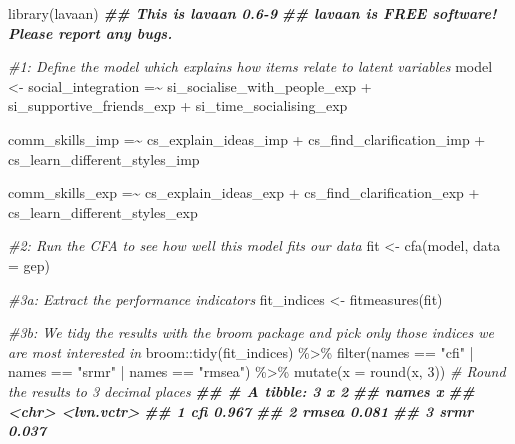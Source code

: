 \documentclass[
]{book}
\newenvironment{Shaded}{\begin{snugshade}}{\end{snugshade}}
\newcommand{\AttributeTok}[1]{\textcolor[rgb]{0.77,0.63,0.00}{#1}}
\newcommand{\CommentTok}[1]{\textcolor[rgb]{0.56,0.35,0.01}{\textit{#1}}}
\newcommand{\DecValTok}[1]{\textcolor[rgb]{0.00,0.00,0.81}{#1}}
\newcommand{\DocumentationTok}[1]{\textcolor[rgb]{0.56,0.35,0.01}{\textbf{\textit{#1}}}}
\newcommand{\FunctionTok}[1]{\textcolor[rgb]{0.00,0.00,0.00}{#1}}
\newcommand{\NormalTok}[1]{#1}
\newcommand{\OtherTok}[1]{\textcolor[rgb]{0.56,0.35,0.01}{#1}}
\newcommand{\SpecialCharTok}[1]{\textcolor[rgb]{0.00,0.00,0.00}{#1}}
\newcommand{\StringTok}[1]{\textcolor[rgb]{0.31,0.60,0.02}{#1}}
\begin{document}
\begin{Shaded}
\begin{Highlighting}[]
\FunctionTok{library}\NormalTok{(lavaan)}
\DocumentationTok{\#\# This is lavaan 0.6{-}9}
\DocumentationTok{\#\# lavaan is FREE software! Please report any bugs.}

\CommentTok{\#1: Define the model which explains how items relate to latent variables}
\NormalTok{model }\OtherTok{\textless{}{-}} \StringTok{\textquotesingle{}}
\StringTok{social\_integration =\textasciitilde{}}
\StringTok{si\_socialise\_with\_people\_exp +}
\StringTok{si\_supportive\_friends\_exp +}
\StringTok{si\_time\_socialising\_exp}

\StringTok{comm\_skills\_imp =\textasciitilde{}}
\StringTok{cs\_explain\_ideas\_imp +}
\StringTok{cs\_find\_clarification\_imp +}
\StringTok{cs\_learn\_different\_styles\_imp}

\StringTok{comm\_skills\_exp =\textasciitilde{}}
\StringTok{cs\_explain\_ideas\_exp +}
\StringTok{cs\_find\_clarification\_exp +}
\StringTok{cs\_learn\_different\_styles\_exp}
\StringTok{\textquotesingle{}}

\CommentTok{\#2: Run the CFA to see how well this model fits our data}
\NormalTok{fit }\OtherTok{\textless{}{-}} \FunctionTok{cfa}\NormalTok{(model, }\AttributeTok{data =}\NormalTok{ gep)}

\CommentTok{\#3a: Extract the performance indicators}
\NormalTok{fit\_indices }\OtherTok{\textless{}{-}} \FunctionTok{fitmeasures}\NormalTok{(fit)}

\CommentTok{\#3b: We tidy the results with the \textquotesingle{}broom\textquotesingle{} package and pick only those indices we are most interested in}
\NormalTok{broom}\SpecialCharTok{::}\FunctionTok{tidy}\NormalTok{(fit\_indices) }\SpecialCharTok{\%\textgreater{}\%}
  \FunctionTok{filter}\NormalTok{(names }\SpecialCharTok{==} \StringTok{"cfi"} \SpecialCharTok{|} 
\NormalTok{         names }\SpecialCharTok{==} \StringTok{"srmr"} \SpecialCharTok{|}
\NormalTok{         names }\SpecialCharTok{==} \StringTok{"rmsea"}\NormalTok{) }\SpecialCharTok{\%\textgreater{}\%} 
  \FunctionTok{mutate}\NormalTok{(}\AttributeTok{x =} \FunctionTok{round}\NormalTok{(x, }\DecValTok{3}\NormalTok{))         }\CommentTok{\# Round the results to 3 decimal places}
\DocumentationTok{\#\# \# A tibble: 3 x 2}
\DocumentationTok{\#\#   names x         }
\DocumentationTok{\#\#   \textless{}chr\textgreater{} \textless{}lvn.vctr\textgreater{}}
\DocumentationTok{\#\# 1 cfi   0.967     }
\DocumentationTok{\#\# 2 rmsea 0.081     }
\DocumentationTok{\#\# 3 srmr  0.037}
\end{Highlighting}
\end{Shaded}
\end{document}
